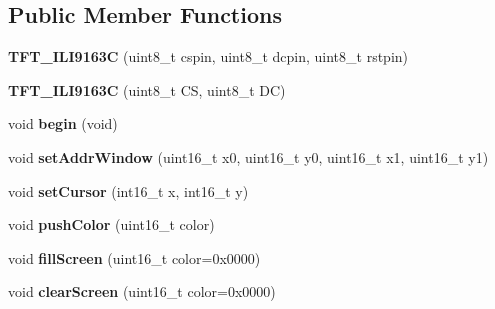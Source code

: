 \subsection*{Public Member Functions}
\begin{DoxyCompactItemize}
\item 
\hypertarget{class_t_f_t___i_l_i9163_c_a69057bb8379a817a2c5e95b8b6ebd523}{}{\bfseries T\+F\+T\+\_\+\+I\+L\+I9163\+C} (uint8\+\_\+t cspin, uint8\+\_\+t dcpin, uint8\+\_\+t rstpin)\label{class_t_f_t___i_l_i9163_c_a69057bb8379a817a2c5e95b8b6ebd523}

\item 
\hypertarget{class_t_f_t___i_l_i9163_c_a3e018ef9364979907bf63b5bb58e87e8}{}{\bfseries T\+F\+T\+\_\+\+I\+L\+I9163\+C} (uint8\+\_\+t C\+S, uint8\+\_\+t D\+C)\label{class_t_f_t___i_l_i9163_c_a3e018ef9364979907bf63b5bb58e87e8}

\item 
\hypertarget{class_t_f_t___i_l_i9163_c_aa3feb165f33ded19b6f04e04fce36057}{}void {\bfseries begin} (void)\label{class_t_f_t___i_l_i9163_c_aa3feb165f33ded19b6f04e04fce36057}

\item 
\hypertarget{class_t_f_t___i_l_i9163_c_a040ae29004c5b663266d5a28802cee11}{}void {\bfseries set\+Addr\+Window} (uint16\+\_\+t x0, uint16\+\_\+t y0, uint16\+\_\+t x1, uint16\+\_\+t y1)\label{class_t_f_t___i_l_i9163_c_a040ae29004c5b663266d5a28802cee11}

\item 
\hypertarget{class_t_f_t___i_l_i9163_c_ab8b9d3651d2100b6159360a9bfec4766}{}void {\bfseries set\+Cursor} (int16\+\_\+t x, int16\+\_\+t y)\label{class_t_f_t___i_l_i9163_c_ab8b9d3651d2100b6159360a9bfec4766}

\item 
\hypertarget{class_t_f_t___i_l_i9163_c_a640a950975890ff5a9972d049543c9f3}{}void {\bfseries push\+Color} (uint16\+\_\+t color)\label{class_t_f_t___i_l_i9163_c_a640a950975890ff5a9972d049543c9f3}

\item 
\hypertarget{class_t_f_t___i_l_i9163_c_a3d701596aad995d50205fc5775b66570}{}void {\bfseries fill\+Screen} (uint16\+\_\+t color=0x0000)\label{class_t_f_t___i_l_i9163_c_a3d701596aad995d50205fc5775b66570}

\item 
\hypertarget{class_t_f_t___i_l_i9163_c_a5d56e4291ec0fbd83b1cc2594903dfd4}{}void {\bfseries clear\+Screen} (uint16\+\_\+t color=0x0000)\label{class_t_f_t___i_l_i9163_c_a5d56e4291ec0fbd83b1cc2594903dfd4}


\end{DoxyCompactItemize}
